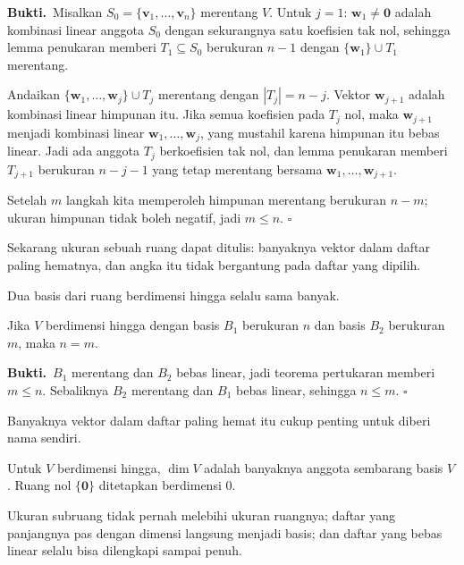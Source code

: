 \par\medskip\noindent\textbf{Bukti.}\ 
Misalkan $S_{0}=\{\mathbf{v}_{1},\dots,\mathbf{v}_{n}\}$ merentang $V$. Untuk $j=1$:
$\mathbf{w}_{1}\neq\mathbf{0}$ adalah kombinasi linear anggota $S_{0}$ dengan sekurangnya
satu koefisien tak nol, sehingga lemma penukaran memberi $T_{1}\subseteq S_{0}$ berukuran
$n-1$ dengan $\{\mathbf{w}_{1}\}\cup T_{1}$ merentang.

Andaikan $\{\mathbf{w}_{1},\dots,\mathbf{w}_{j}\}\cup T_{j}$ merentang dengan
$|T_{j}|=n-j$. Vektor $\mathbf{w}_{j+1}$ adalah kombinasi linear himpunan itu. Jika semua
koefisien pada $T_{j}$ nol, maka $\mathbf{w}_{j+1}$ menjadi kombinasi linear
$\mathbf{w}_{1},\dots,\mathbf{w}_{j}$, yang mustahil karena himpunan itu bebas linear. Jadi
ada anggota $T_{j}$ berkoefisien tak nol, dan lemma penukaran memberi $T_{j+1}$ berukuran
$n-j-1$ yang tetap merentang bersama $\mathbf{w}_{1},\dots,\mathbf{w}_{j+1}$.

Setelah $m$ langkah kita memperoleh himpunan merentang berukuran $n-m$; ukuran himpunan tidak
boleh negatif, jadi $m\le n$.
\hfill$\square$\par\medskip

Sekarang ukuran sebuah ruang dapat ditulis: banyaknya vektor dalam daftar paling hematnya,
dan angka itu tidak bergantung pada daftar yang dipilih.

Dua basis dari ruang berdimensi hingga selalu sama banyak.

\begin{akibat}
Jika $V$ berdimensi hingga dengan basis $B_{1}$ berukuran $n$ dan basis $B_{2}$ berukuran
$m$, maka $n=m$.
\end{akibat}

\par\medskip\noindent\textbf{Bukti.}\ 
$B_{1}$ merentang dan $B_{2}$ bebas linear, jadi teorema pertukaran memberi $m\le n$.
Sebaliknya $B_{2}$ merentang dan $B_{1}$ bebas linear, sehingga $n\le m$.
\hfill$\square$\par\medskip

Banyaknya vektor dalam daftar paling hemat itu cukup penting untuk diberi nama sendiri.

\begin{definisi}[Dimensi]
Untuk $V$ berdimensi hingga, $\dim V$ adalah banyaknya anggota sembarang basis $V$. Ruang
nol $\{\mathbf{0}\}$ ditetapkan berdimensi $0$.
\end{definisi}

Ukuran subruang tidak pernah melebihi ukuran ruangnya; daftar yang panjangnya pas dengan
dimensi langsung menjadi basis; dan daftar yang bebas linear selalu bisa dilengkapi sampai
penuh.

